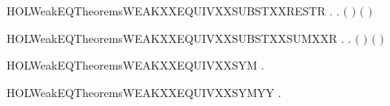 \newcommand{\HOLWeakEQTheoremsWEAKXXEQUIVXXSUBSTXXRELAB}{\UseVerbatim{HOLWeakEQTheoremsWEAKXXEQUIVXXSUBSTXXRELAB}}
\begin{SaveVerbatim}{HOLWeakEQTheoremsWEAKXXEQUIVXXSUBSTXXRESTR}
\HOLTokenTurnstile{} \HOLSymConst{\HOLTokenForall{}} .    \HOLSymConst{\HOLTokenImp{}} \HOLSymConst{\HOLTokenForall{}}.  \ensuremath{(}  \ensuremath{)} \ensuremath{(}  \ensuremath{)}
\end{SaveVerbatim}
\newcommand{\HOLWeakEQTheoremsWEAKXXEQUIVXXSUBSTXXRESTR}{\UseVerbatim{HOLWeakEQTheoremsWEAKXXEQUIVXXSUBSTXXRESTR}}
\begin{SaveVerbatim}{HOLWeakEQTheoremsWEAKXXEQUIVXXSUBSTXXSUMXXR}
\HOLTokenTurnstile{} \HOLSymConst{\HOLTokenForall{}} .
          \HOLSymConst{\HOLTokenConj{}}   \HOLSymConst{\HOLTokenConj{}}   \HOLSymConst{\HOLTokenImp{}}
       \HOLSymConst{\HOLTokenForall{}}.  \ensuremath{(} \HOLSymConst{\ensuremath{+}} \ensuremath{)} \ensuremath{(} \HOLSymConst{\ensuremath{+}} \ensuremath{)}
\end{SaveVerbatim}
\newcommand{\HOLWeakEQTheoremsWEAKXXEQUIVXXSUBSTXXSUMXXR}{\UseVerbatim{HOLWeakEQTheoremsWEAKXXEQUIVXXSUBSTXXSUMXXR}}
\begin{SaveVerbatim}{HOLWeakEQTheoremsWEAKXXEQUIVXXSYM}
\HOLTokenTurnstile{} \HOLSymConst{\HOLTokenForall{}} .    \HOLSymConst{\HOLTokenImp{}}   
\end{SaveVerbatim}
\newcommand{\HOLWeakEQTheoremsWEAKXXEQUIVXXSYM}{\UseVerbatim{HOLWeakEQTheoremsWEAKXXEQUIVXXSYM}}
\begin{SaveVerbatim}{HOLWeakEQTheoremsWEAKXXEQUIVXXSYMYY}
\HOLTokenTurnstile{} \HOLSymConst{\HOLTokenForall{}} .    \HOLSymConst{\HOLTokenEquiv{}}   
\end{SaveVerbatim}
